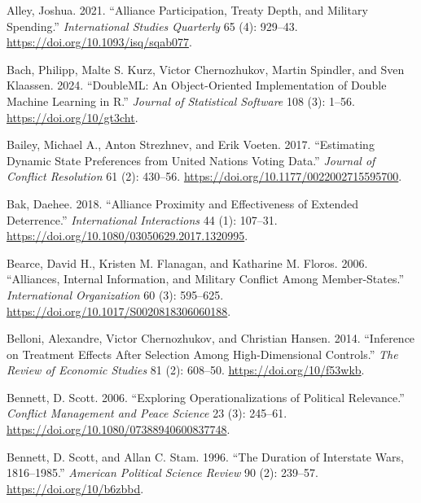 \documentclass[
  letterpaper,
  DIV=11,
  numbers=noendperiod]{scrartcl}
\newlength{\cslhangindent}
\newenvironment{CSLReferences}[2] %
 {\begin{list}{}{%
  \setlength{\itemindent}{0pt}
  \setlength{\leftmargin}{0pt}
  \setlength{\parsep}{0pt}
  \ifodd #1
   \setlength{\leftmargin}{\cslhangindent}
   \setlength{\itemindent}{-1\cslhangindent}
  \fi
  \setlength{\itemsep}{#2\baselineskip}}}
 {\end{list}}
\begin{document}
\label{refs}
\begin{CSLReferences}{1}{0}
Alley, Joshua. 2021. {``Alliance {Participation}, {Treaty Depth}, and
{Military Spending}.''} \emph{International Studies Quarterly} 65 (4):
929--43. \url{https://doi.org/10.1093/isq/sqab077}.

Bach, Philipp, Malte S. Kurz, Victor Chernozhukov, Martin Spindler, and
Sven Klaassen. 2024. {``{DoubleML}: {An} Object-Oriented Implementation
of Double Machine Learning in {R}.''} \emph{Journal of Statistical
Software} 108 (3): 1--56. \url{https://doi.org/10/gt3cht}.

Bailey, Michael A., Anton Strezhnev, and Erik Voeten. 2017.
{``Estimating {Dynamic State Preferences} from {United Nations Voting
Data}.''} \emph{Journal of Conflict Resolution} 61 (2): 430--56.
\url{https://doi.org/10.1177/0022002715595700}.

Bak, Daehee. 2018. {``Alliance {Proximity} and {Effectiveness} of
{Extended Deterrence}.''} \emph{International Interactions} 44 (1):
107--31. \url{https://doi.org/10.1080/03050629.2017.1320995}.

Bearce, David H., Kristen M. Flanagan, and Katharine M. Floros. 2006.
{``Alliances, {Internal Information}, and {Military Conflict Among
Member-States}.''} \emph{International Organization} 60 (3): 595--625.
\url{https://doi.org/10.1017/S0020818306060188}.

Belloni, Alexandre, Victor Chernozhukov, and Christian Hansen. 2014.
{``Inference on {Treatment Effects} After {Selection} Among
{High-Dimensional Controls}.''} \emph{The Review of Economic Studies} 81
(2): 608--50. \url{https://doi.org/10/f53wkb}.

Bennett, D. Scott. 2006. {``Exploring {Operationalizations} of
{Political Relevance}.''} \emph{Conflict Management and Peace Science}
23 (3): 245--61. \url{https://doi.org/10.1080/07388940600837748}.

Bennett, D. Scott, and Allan C. Stam. 1996. {``The {Duration} of
{Interstate Wars}, 1816--1985.''} \emph{American Political Science
Review} 90 (2): 239--57. \url{https://doi.org/10/b6zbbd}.


\end{CSLReferences}
\end{document}

